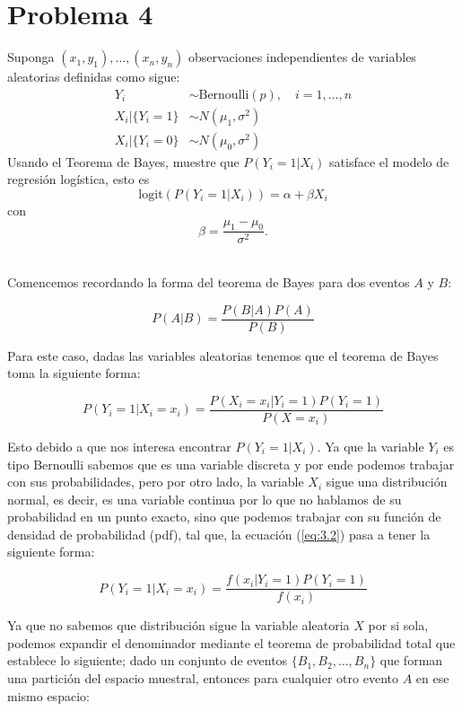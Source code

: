 \section*{Problema \textcolor{CIMATRed}{4}}

Suponga $(x_1, y_1), \dots, (x_n, y_n)$ observaciones independientes de variables aleatorias definidas como sigue:
\begin{align*}
    Y_i & \sim \text{Bernoulli}(p), \quad i = 1, \dots, n \\
    X_i | \{Y_i = 1\} & \sim N(\mu_1, \sigma^2) \\
    X_i | \{Y_i = 0\} & \sim N(\mu_0, \sigma^2)
\end{align*}
Usando el Teorema de Bayes, muestre que $P(Y_i = 1|X_i)$ satisface el modelo de regresión logística, esto es
\[
\text{logit}\left( P(Y_i = 1|X_i) \right) = \alpha + \beta X_i
\]
con
\[
\beta = \frac{\mu_1 - \mu_0}{\sigma^2}.
\]

\noindent{}\\

Comencemos recordando la forma del teorema de Bayes para dos eventos $A$ y $B$:

\begin{equation}
    P(A|B)=\frac{P(B|A)P(A)}{P(B)}    
    \label{eq:3.1}
\end{equation}

Para este caso, dadas las variables aleatorias tenemos que el teorema de Bayes toma la siguiente forma:

\begin{equation}
    P(Y_i=1|X_i=x_i)=\frac{P(X_i=x_i|Y_i=1)P(Y_i=1)}{P(X=x_i)}  
    \label{eq:3.2}
\end{equation}

Esto debido a que nos interesa encontrar $P(Y_i=1|X_i)$. Ya que la variable $Y_i$ es tipo Bernoulli sabemos que es una variable discreta y por ende podemos trabajar con sus probabilidades, pero por otro lado, la variable $X_i$ sigue una distribución normal, es decir, es una variable continua por lo que no hablamos de su probabilidad en un punto exacto, sino que podemos trabajar con su función de densidad de probabilidad (pdf), tal que, la ecuación (\ref{eq:3.2}) pasa a tener la siguiente forma:

\begin{equation}
    P(Y_i=1|X_i=x_i)=\frac{f(x_i|Y_i=1)P(Y_i=1)}{f(x_i)}
    \label{eq:3.3}
\end{equation}

Ya que no sabemos que distribución sigue la variable aleatoria $X$ por si sola, podemos expandir el denominador mediante el teorema de probabilidad total que establece lo siguiente; dado un conjunto de eventos $\{B_1,B_2,\dots,B_n\}$ que forman una partición del espacio muestral, entonces para cualquier otro evento $A$ en ese mismo espacio:

